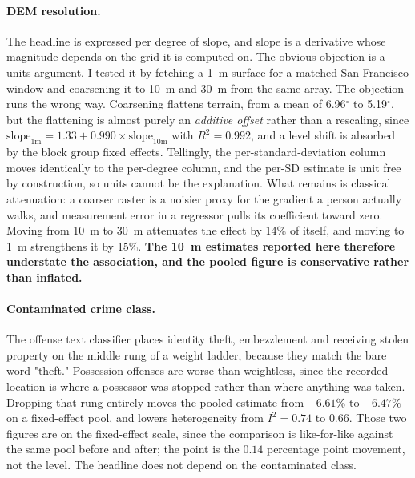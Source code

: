 \documentclass[12pt,letterpaper]{article}
\begin{document}
\paragraph{DEM resolution.} The headline is expressed per degree of slope, and slope is
a derivative whose magnitude depends on the grid it is computed on. The obvious
objection is a units argument. I tested it by fetching a 1~m surface for a matched
San Francisco window and coarsening it to 10~m and 30~m from the same array. The
objection runs the wrong way. Coarsening flattens terrain, from a mean of 6.96$^\circ$
to 5.19$^\circ$, but the flattening is almost purely an \emph{additive offset} rather
than a rescaling, since $\text{slope}_{1\text{m}} = 1.33 + 0.990 \times
\text{slope}_{10\text{m}}$ with $R^2 = 0.992$, and a level shift is absorbed by the
block group fixed effects. Tellingly, the per-standard-deviation column moves
identically to the per-degree column, and the per-SD estimate is unit free by
construction, so units cannot be the explanation. What remains is classical
attenuation: a coarser raster is a noisier proxy for the gradient a person actually
walks, and measurement error in a regressor pulls its coefficient toward zero. Moving
from 10~m to 30~m attenuates the effect by 14\% of itself, and moving to 1~m
strengthens it by 15\%. \textbf{The 10~m estimates reported here therefore understate
the association, and the pooled figure is conservative rather than inflated.}

\paragraph{Contaminated crime class.} The offense text classifier places identity
theft, embezzlement and receiving stolen property on the middle rung of a weight
ladder, because they match the bare word "theft." Possession offenses are worse than
weightless, since the recorded location is where a possessor was stopped rather than
where anything was taken. Dropping that rung entirely moves the pooled estimate from
$-6.61\%$ to $-6.47\%$ on a fixed-effect pool, and lowers heterogeneity from
$I^2 = 0.74$ to $0.66$. Those two figures are on the fixed-effect scale, since the
comparison is like-for-like against the same pool before and after; the point is the
$0.14$ percentage point movement, not the level. The headline does not depend on the
contaminated class.
\end{document}
